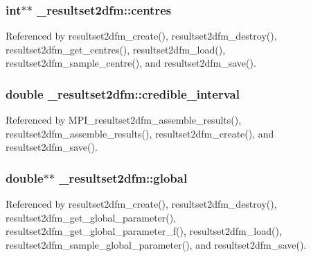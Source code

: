 \subsubsection[{\texorpdfstring{centres}{centres}}]{\setlength{\rightskip}{0pt plus 5cm}int$\ast$$\ast$ \+\_\+resultset2dfm\+::centres}\hypertarget{struct__resultset2dfm_af4e9289be60e4d2d09306de249b20a38}{}\label{struct__resultset2dfm_af4e9289be60e4d2d09306de249b20a38}


Referenced by resultset2dfm\+\_\+create(), resultset2dfm\+\_\+destroy(), resultset2dfm\+\_\+get\+\_\+centres(), resultset2dfm\+\_\+load(), resultset2dfm\+\_\+sample\+\_\+centre(), and resultset2dfm\+\_\+save().

\subsubsection[{\texorpdfstring{credible\+\_\+interval}{credible_interval}}]{\setlength{\rightskip}{0pt plus 5cm}double \+\_\+resultset2dfm\+::credible\+\_\+interval}\hypertarget{struct__resultset2dfm_a25273ec9d03eea17fb0771299daaf0b3}{}\label{struct__resultset2dfm_a25273ec9d03eea17fb0771299daaf0b3}


Referenced by M\+P\+I\+\_\+resultset2dfm\+\_\+assemble\+\_\+results(), resultset2dfm\+\_\+assemble\+\_\+results(), resultset2dfm\+\_\+create(), and resultset2dfm\+\_\+save().

\subsubsection[{\texorpdfstring{global}{global}}]{\setlength{\rightskip}{0pt plus 5cm}double$\ast$$\ast$ \+\_\+resultset2dfm\+::global}\hypertarget{struct__resultset2dfm_ab5f6e5a2735d6ba07d6290a05e784ddc}{}\label{struct__resultset2dfm_ab5f6e5a2735d6ba07d6290a05e784ddc}


Referenced by resultset2dfm\+\_\+create(), resultset2dfm\+\_\+destroy(), resultset2dfm\+\_\+get\+\_\+global\+\_\+parameter(), resultset2dfm\+\_\+get\+\_\+global\+\_\+parameter\+\_\+f(), resultset2dfm\+\_\+load(), resultset2dfm\+\_\+sample\+\_\+global\+\_\+parameter(), and resultset2dfm\+\_\+save().

